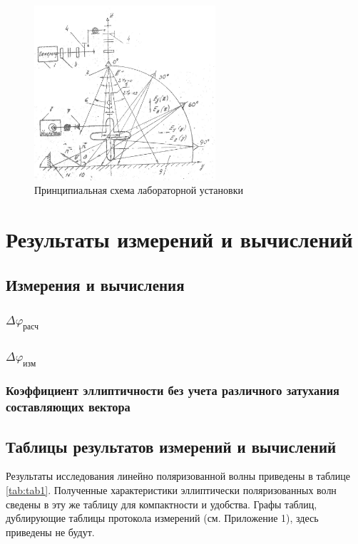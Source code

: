 \documentclass[11pt,a4paper,oneside, titlepage,reqno]{amsproc}
\renewcommand{\phi}{\varphi}
\begin{document}
\begin{figure}[h!]
    \begin{center}
        \includegraphics[width=0.60\textwidth]{scheme.jpg}
    \end{center}
    \vspace{-20pt}
    \caption{Принципиальная схема лабораторной установки}
    \label{fig:scheme}
\end{figure}

\newpage
\section{Результаты измерений и вычислений}
\subsection{Измерения и вычисления}
\subsubsection{$\Delta\phi_{расч}$}

\subsubsection{$\Delta\phi_{изм}$}

\subsubsection{Коэффициент эллиптичности без учета различного затухания составляющих вектора}

\subsection{Таблицы результатов измерений и вычислений}
Результаты исследования линейно поляризованной волны приведены в таблице
\ref{tab:tab1}. Полученные характеристики эллиптически поляризованных
волн сведены в эту же таблицу для компактности и удобства.
Графы таблиц, дублирующие таблицы протокола измерений (см. Приложение 1),
здесь приведены не будут.
\end{document}
